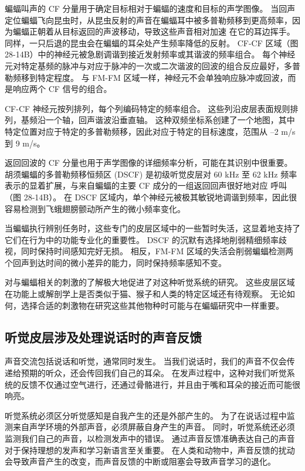 蝙蝠叫声的 CF 分量用于确定目标相对于蝙蝠的速度和目标的声学图像。 当回声定位蝙蝠飞向昆虫时，从昆虫反射的声音在蝙蝠耳中被多普勒频移到更高频率，因为蝙蝠正朝着从目标返回的声波移动，导致这些声音相对加速 在它的耳边挥手。 同样，一只后退的昆虫会在蝙蝠的耳朵处产生频率降低的反射。 CF-CF 区域（图 28-14B）中的神经元被急剧调谐到接近发射频率或其谐波的频率组合。 每个神经元对特定基频的脉冲与对应于脉冲的一次或二次谐波的回波的组合反应最好，多普勒频移到特定程度。 与 FM-FM 区域一样，神经元不会单独响应脉冲或回波，而是响应两个 CF 信号的组合。

CF-CF 神经元按列排列，每个列编码特定的频率组合。 这些列沿皮层表面规则排列，基频沿一个轴，回声谐波沿垂直轴。 这种双频坐标系创建了一个地图，其中特定位置对应于特定的多普勒频移，因此对应于特定的目标速度，范围从 –2 m/s 到 9 m/s。

返回回波的 CF 分量也用于声学图像的详细频率分析，可能在其识别中很重要。 胡须蝙蝠的多普勒频移恒频区 (DSCF) 是初级听觉皮层对 60 kHz 至 62 kHz 频率表示的显着扩展，与来自蝙蝠的主要 CF 成分的一组返回回声很好地对应 呼叫（图 28-14B）。 在 DSCF 区域内，单个神经元被极其敏锐地调谐到频率，因此很容易检测到飞蛾翅膀颤动所产生的微小频率变化。

当蝙蝠执行辨别任务时，这些专门的皮层区域中的一些暂时失活，这显着地支持了它们在行为中的功能专业化的重要性。 DSCF 的沉默有选择地削弱精细频率歧视，同时保持时间感知完好无损。 相反，FM-FM 区域的失活会削弱蝙蝠检测两个回声到达时间的微小差异的能力，同时保持频率感知不变。

对与蝙蝠相关的刺激的了解极大地促进了对这种听觉系统的研究。 这些皮层区域在功能上或解剖学上是否类似于猫、猴子和人类的特定区域还有待观察。 无论如何，选择合适的刺激物在研究这些其他物种时可能与在蝙蝠研究中一样重要。

\subsection{听觉皮层涉及处理说话时的声音反馈}
声音交流包括说话和听觉，通常同时发生。 当我们说话时，我们的声音不仅会传递给预期的听众，还会传回我们自己的耳朵。 在发声过程中，这种对我们听觉系统的反馈不仅通过空气进行，还通过骨骼进行，并且由于嘴和耳朵的接近而可能很响亮。

听觉系统必须区分听觉感知是自我产生的还是外部产生的。 为了在说话过程中监测来自声学环境的外部声音，必须屏蔽自身产生的声音。 同时，听觉系统还必须监测我们自己的声音，以检测发声中的错误。 通过声音反馈准确表达自己的声音对于保持理想的发声和学习新语言至关重要。 在人类和动物中，声音反馈的扰动会导致声音产生的改变，而声音反馈的中断或阻塞会导致声音学习的退化。

